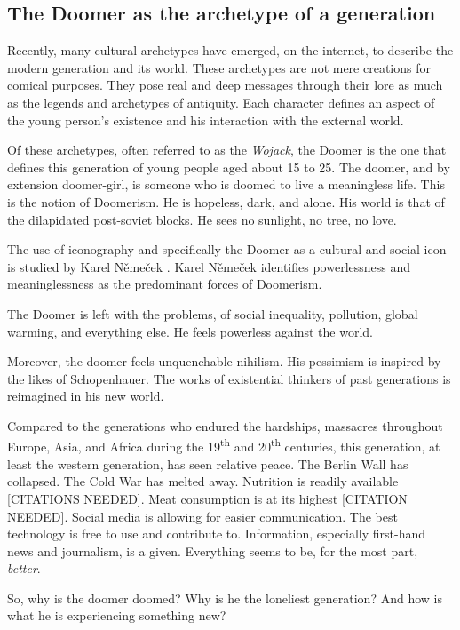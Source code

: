 \documentclass[../report.tex]{subfiles}
\begin{document}
\subsection{The Doomer as the archetype of a generation}

Recently, many cultural archetypes have emerged, on the internet, to describe the modern generation and its world. 
These archetypes are not mere creations for comical purposes. They pose real and deep messages through their lore as much as the legends and archetypes of antiquity.
Each character defines an aspect of the young person's existence and his interaction with the external world. 

Of these archetypes, often referred to as the \textit{Wojack}, the Doomer is the one that defines this generation of young people aged about 15 to 25.
The doomer, and by extension doomer-girl, is someone who is doomed to live a meaningless life. This is the notion of Doomerism.
He is hopeless, dark, and alone. His world is that of the dilapidated post-soviet blocks. He sees no sunlight, no tree, no love. 

The use of iconography and specifically the Doomer as a cultural and social icon is studied by Karel Němeček \cite{memes_reservoir}. Karel Němeček identifies powerlessness and meaninglessness as the predominant forces of Doomerism. 

The Doomer is left with the problems, of social inequality, pollution, global warming, and everything else. He feels powerless against the world.

Moreover, the doomer feels unquenchable nihilism. His pessimism is inspired by the likes of Schopenhauer. The works of existential thinkers of past generations is reimagined in his new world. 

Compared to the generations who endured the hardships, massacres throughout Europe, Asia, and Africa during the 19\textsuperscript{th} and 20\textsuperscript{th} centuries, 
this generation, at least the western generation, has seen relative peace. 
The Berlin Wall has collapsed.
The Cold War has melted away.
Nutrition is readily available [CITATIONS NEEDED]. 
Meat consumption is at its highest [CITATION NEEDED].
Social media is allowing for easier communication.
The best technology is free to use and contribute to.
Information, especially first-hand news and journalism, is a given.
Everything seems to be, for the most part, \textit{better}.

So, why is the doomer doomed? Why is he the loneliest generation? And how is what he is experiencing something new?
\end{document}
